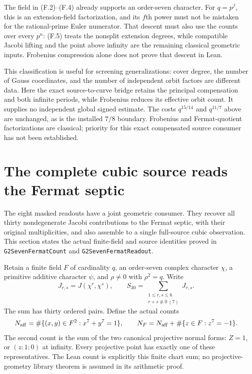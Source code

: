 \documentclass[11pt]{article}
\begin{document}
The field in (F.2)--(F.4) already supports an order-seven character.
For $q=p^f$, this is an extension-field factorization, and its $f$th
power must not be mistaken for the rational-prime Euler numerator.
That descent must also use the counts over every $p^n$:
(F.5) treats the nonsplit extension degrees, while compatible
Jacobi lifting and the point above infinity are the remaining
classical geometric inputs. Frobenius compression alone does not
prove that descent in Lean.

This classification is useful for screening generalizations:
cover degree, the number of Gauss coordinates, and the number of
independent orbit factors are different data. Here the exact
source-to-curve bridge retains the principal compensation and
both infinite periods, while Frobenius reduces its effective
orbit count. It supplies no independent global signed estimate.
The costs $q^{15/14}$ and $q^{11/7}$ above are unchanged, as is
the installed $7/8$ boundary. Frobenius and Fermat-quotient
factorizations are classical; priority for this exact compensated
source consumer has not been established.


\section{The complete cubic source reads the Fermat septic}
\label{sec:G2-fermat}

The eight masked readouts have a joint geometric consumer. They
recover all thirty nondegenerate Jacobi contributions to the Fermat
septic, with their original multiplicities, and also assemble to a
single full-source cubic observation. This section states the actual
finite-field and source identities proved in
\texttt{G2SevenFermatCount} and \texttt{G2SevenFermatReadout}.

Retain a finite field $F$ of cardinality $q$, an order-seven complex
character $\chi$, a primitive additive character $\psi$, and
$\rho\ne0$ with $\rho^2=q$. Write
\[
 J_{r,s}=J(\chi^r,\chi^s),\qquad
 S_{30}=\sum_{\substack{1\le r,s\le6\\r+s\not\equiv0\ (7)}}J_{r,s}.
\]
The sum has thirty ordered pairs. Define the actual counts
\[
 N_{\rm aff}=\#\{(x,y)\in F^2:x^7+y^7=1\},\qquad
 N_F=N_{\rm aff}+\#\{z\in F:z^7=-1\}.
\]
The second count is the sum of the two canonical projective normal
forms: $Z=1$, or $(z:1:0)$ at infinity. Every projective point has
exactly one of these representatives. The Lean count is explicitly
this finite chart sum; no projective-geometry library theorem is
assumed in its arithmetic proof.
\end{document}
